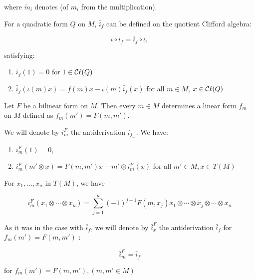 \begin{definition}
    where $\check{m}_{i}$ denotes  (of $m_i$ from the multiplication).

    For a quadratic form $Q$ on $M$,
    $\bar{i}_{f}$ can be defined on the quotient Clifford algebra:

    $$
    \iota \circ i_{f} = \bar{i}_{f} \circ \iota,
    $$

    satisfying:

    \begin{enumerate}

    \item $\bar{i}_{f}(1) = 0$ for $1 \in \mathop{\mathcal{C}\ell}(Q)$

    \item $\bar{i}_{f}\left( \iota(m) x \right) = f(m) x - \iota(m) \bar{i}_{f}(x)$ for all  $m \in M$, $x \in \mathop{\mathcal{C}\ell}(Q)$
    
    \end{enumerate}

    Let $F$ be a bilinear form on $M$. Then every $m \in M$ determines a linear form $f_{m}$ on $M$ defined as $f_{m}(m') = F(m, m')$.
    
    We will denote by $i_{m}^{F}$ the antiderivation $i_{f_{m}}$. We have:

    \begin{enumerate}

    \item $i_{m}^{F}(1) = 0$,

    \item $ i_{m}^{F}(m' \otimes x) = F(m, m') x - m' \otimes i_{m}^{F}(x) $ for all $m' \in M, x \in T(M)$

    \end{enumerate}

    For $x_{1}, \ldots, x_{n}$ in $T(M)$, we have

    $$
    i_{m}^{F}\left(x_{1} \otimes \cdots \otimes x_{n}\right) = \sum_{j=1}^{n}(-1)^{j-1} F\left(m, x_{j}\right) x_{1} \otimes \cdots \otimes \check{x}_{j} \otimes \cdots \otimes x_{n}
    $$

    As it was in the case with $\bar{i}_{f}$, we will denote by $\bar{i}_{x}^{F}$ the antiderivation $\bar{i}_{f}$ for $f_m(m') = F(m, m')$ :

    $$
    \bar{i}_{m}^{F}=\bar{i}_{f}
    $$

    for $f_m(m') = F(m, m'), (m, m' \in M)$




\end{definition}
